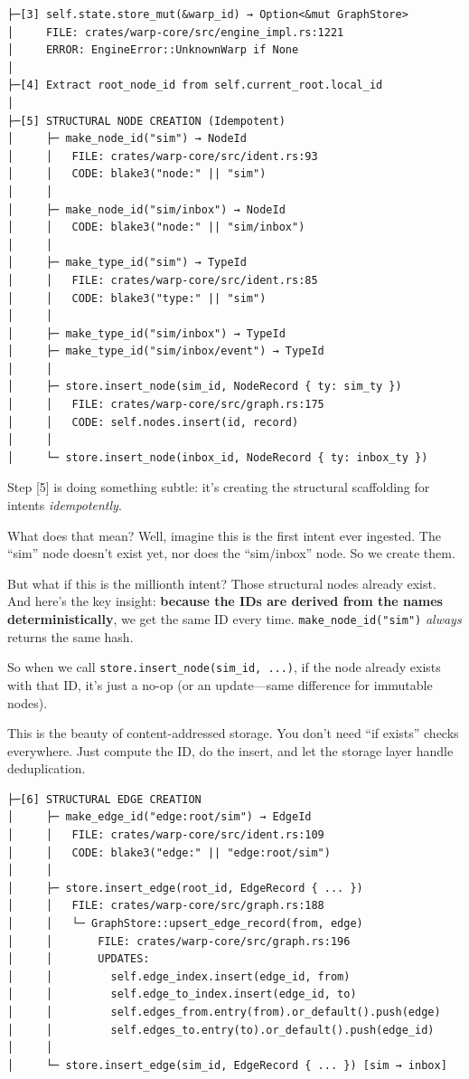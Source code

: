 \documentclass[11pt]{book}
\newenvironment{directors}
{\begin{mdframed}[
  linecolor=blue!60,
  linewidth=2pt,
  leftline=true,
  rightline=false,
  topline=false,
  bottomline=false,
  backgroundcolor=blue!3,
  innerleftmargin=12pt,
  innerrightmargin=10pt,
  innertopmargin=8pt,
  innerbottommargin=8pt,
  skipabove=12pt,
  skipbelow=12pt
]\small\sffamily\color{blue!70!black}}
{\end{mdframed}}
\begin{document}
\begin{verbatim}
├─[3] self.state.store_mut(&warp_id) → Option<&mut GraphStore>
│     FILE: crates/warp-core/src/engine_impl.rs:1221
│     ERROR: EngineError::UnknownWarp if None
│
├─[4] Extract root_node_id from self.current_root.local_id
│
├─[5] STRUCTURAL NODE CREATION (Idempotent)
│     ├─ make_node_id("sim") → NodeId
│     │   FILE: crates/warp-core/src/ident.rs:93
│     │   CODE: blake3("node:" || "sim")
│     │
│     ├─ make_node_id("sim/inbox") → NodeId
│     │   CODE: blake3("node:" || "sim/inbox")
│     │
│     ├─ make_type_id("sim") → TypeId
│     │   FILE: crates/warp-core/src/ident.rs:85
│     │   CODE: blake3("type:" || "sim")
│     │
│     ├─ make_type_id("sim/inbox") → TypeId
│     ├─ make_type_id("sim/inbox/event") → TypeId
│     │
│     ├─ store.insert_node(sim_id, NodeRecord { ty: sim_ty })
│     │   FILE: crates/warp-core/src/graph.rs:175
│     │   CODE: self.nodes.insert(id, record)
│     │
│     └─ store.insert_node(inbox_id, NodeRecord { ty: inbox_ty })
\end{verbatim}

\begin{directors}
Step [5] is doing something subtle: it's creating the structural scaffolding for intents \emph{idempotently}.

What does that mean? Well, imagine this is the first intent ever ingested. The ``sim'' node doesn't exist yet, nor does the ``sim/inbox'' node. So we create them.

But what if this is the millionth intent? Those structural nodes already exist. And here's the key insight: \textbf{because the IDs are derived from the names deterministically}, we get the same ID every time. \texttt{make\_node\_id("sim")} \emph{always} returns the same hash.

So when we call \texttt{store.insert\_node(sim\_id, ...)}, if the node already exists with that ID, it's just a no-op (or an update---same difference for immutable nodes).

This is the beauty of content-addressed storage. You don't need ``if exists'' checks everywhere. Just compute the ID, do the insert, and let the storage layer handle deduplication.
\end{directors}

\begin{verbatim}
├─[6] STRUCTURAL EDGE CREATION
│     ├─ make_edge_id("edge:root/sim") → EdgeId
│     │   FILE: crates/warp-core/src/ident.rs:109
│     │   CODE: blake3("edge:" || "edge:root/sim")
│     │
│     ├─ store.insert_edge(root_id, EdgeRecord { ... })
│     │   FILE: crates/warp-core/src/graph.rs:188
│     │   └─ GraphStore::upsert_edge_record(from, edge)
│     │       FILE: crates/warp-core/src/graph.rs:196
│     │       UPDATES:
│     │         self.edge_index.insert(edge_id, from)
│     │         self.edge_to_index.insert(edge_id, to)
│     │         self.edges_from.entry(from).or_default().push(edge)
│     │         self.edges_to.entry(to).or_default().push(edge_id)
│     │
│     └─ store.insert_edge(sim_id, EdgeRecord { ... }) [sim → inbox]
\end{verbatim}
\end{document}
